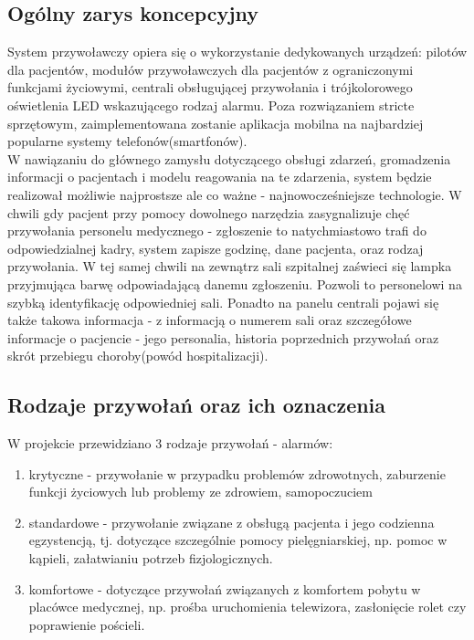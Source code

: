 \documentclass[12pt]{article} %
\begin{document}
\subsection{Ogólny zarys koncepcyjny}
System przywoławczy opiera się o wykorzystanie dedykowanych urządzeń: pilotów dla pacjentów, modułów przywoławczych dla pacjentów z ograniczonymi funkcjami życiowymi, centrali obsługującej przywołania i trójkolorowego oświetlenia LED wskazującego rodzaj alarmu. Poza rozwiązaniem stricte sprzętowym, zaimplementowana zostanie aplikacja mobilna na najbardziej popularne systemy telefonów(smartfonów).
\\
W nawiązaniu do głównego zamysłu dotyczącego obsługi zdarzeń, gromadzenia informacji o pacjentach i modelu reagowania na te zdarzenia, system będzie realizował możliwie najprostsze ale co ważne - najnowocześniejsze technologie. W chwili gdy pacjent przy pomocy dowolnego narzędzia zasygnalizuje chęć przywołania personelu medycznego - zgłoszenie to natychmiastowo trafi do odpowiedzialnej kadry, system zapisze godzinę, dane pacjenta, oraz rodzaj przywołania. W tej samej chwili na zewnątrz sali szpitalnej zaświeci się lampka przyjmująca barwę odpowiadającą danemu zgłoszeniu. Pozwoli to personelowi na szybką identyfikację odpowiedniej sali. Ponadto na panelu centrali pojawi się także takowa informacja  - z informacją o numerem sali oraz szczegółowe informacje o pacjencie - jego personalia, historia poprzednich przywołań oraz skrót przebiegu choroby(powód hospitalizacji).


\newpage
\subsection{Rodzaje przywołań oraz ich oznaczenia}

W projekcie przewidziano 3 rodzaje przywołań - alarmów:
\begin{enumerate}
\item krytyczne - przywołanie w przypadku problemów zdrowotnych, zaburzenie funkcji życiowych lub problemy ze zdrowiem, samopoczuciem
\item standardowe - przywołanie związane z obsługą pacjenta i jego codzienna egzystencją, tj. dotyczące szczególnie pomocy pielęgniarskiej, np. pomoc w kąpieli, załatwianiu potrzeb fizjologicznych.
\item komfortowe - dotyczące przywołań związanych z komfortem pobytu w placówce medycznej, np. prośba uruchomienia telewizora, zasłonięcie rolet czy poprawienie pościeli.
\end{enumerate}
\end{document}
